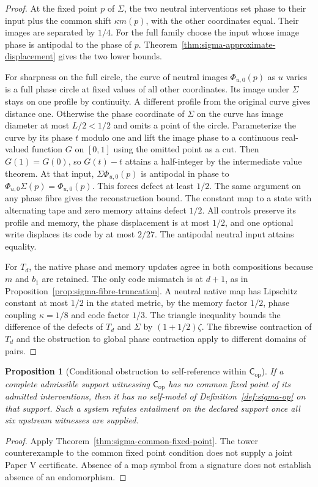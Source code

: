\documentclass[11pt,a4paper]{article}
\newtheorem{proposition}[theorem]{Proposition}
\theoremstyle{definition}
\newcommand{\Cop}{\mathsf{C}_{\mathrm{op}}}
\begin{document}
\begin{proof}
At the fixed point $p$ of $\Sigma$, the two neutral interventions set phase to their input plus the common shift $\kappa m(p)$, with the other coordinates equal. Their images are separated by $1/4$. For the full family choose the input whose image phase is antipodal to the phase of $p$. Theorem~\ref{thm:sigma-approximate-displacement} gives the two lower bounds.

For sharpness on the full circle, the curve of neutral images $\Phi_{u,0}(p)$ as $u$ varies is a full phase circle at fixed values of all other coordinates. Its image under $\Sigma$ stays on one profile by continuity. A different profile from the original curve gives distance one. Otherwise the phase coordinate of $\Sigma$ on the curve has image diameter at most $L/2<1/2$ and omits a point of the circle. Parameterize the curve by its phase $t$ modulo one and lift the image phase to a continuous real-valued function $G$ on $[0,1]$ using the omitted point as a cut. Then $G(1)=G(0)$, so $G(t)-t$ attains a half-integer by the intermediate value theorem. At that input, $\Sigma\Phi_{u,0}(p)$ is antipodal in phase to $\Phi_{u,0}\Sigma(p)=\Phi_{u,0}(p)$. This forces defect at least $1/2$. The same argument on any phase fibre gives the reconstruction bound. The constant map to a state with alternating tape and zero memory attains defect $1/2$. All controls preserve its profile and memory, the phase displacement is at most $1/2$, and one optional write displaces its code by at most $2/27$. The antipodal neutral input attains equality.

For $T_d$, the native phase and memory updates agree in both compositions because $m$ and $b_1$ are retained. The only code mismatch is at $d+1$, as in Proposition~\ref{prop:sigma-fibre-truncation}. A neutral native map has Lipschitz constant at most $1/2$ in the stated metric, by the memory factor $1/2$, phase coupling $\kappa=1/8$ and code factor $1/3$. The triangle inequality bounds the difference of the defects of $T_d$ and $\Sigma$ by $(1+1/2)\zeta$. The fibrewise contraction of $T_d$ and the obstruction to global phase contraction apply to different domains of pairs.
\end{proof}

\begin{proposition}[Conditional obstruction to self-reference within $\Cop$]\label{prop:sigma-not-entailed}
If a complete admissible support witnessing $\Cop$ has no common fixed point of its admitted interventions, then it has no self-model of Definition~\ref{def:sigma-op} on that support. Such a system refutes entailment on the declared support once all six upstream witnesses are supplied.
\end{proposition}
\begin{proof}
Apply Theorem~\ref{thm:sigma-common-fixed-point}. The tower counterexample to the common fixed point condition does not supply a joint Paper V certificate. Absence of a map symbol from a signature does not establish absence of an endomorphism.
\end{proof}
\end{document}
